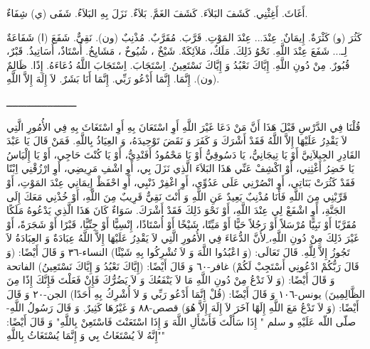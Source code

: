 \documentclass[a5paper]{article}
\begin{document}
أَغَاثَ. أَغِثْنِي. كَشَفَ البَلاَءَ. كَشَفَ الغَمَّ. بَلاَءٌ. نَزَلَ بِهِ البَلاَءُ. شَفَى (ي) شِفَاءٌ.

كَثُرَ (و) كَثْرَةٌ. إِيمَانٌ. عِنْدَ... عِنْدَ المَوْتِ. قَرَّبَ. مُقَرَّبٌ. مُذْنِبٌ (ون). نَقِيٌّ. شَفَعَ (ا) شَفَاعَةٌ لِـ... شَفَعَ عِنْدَ اللَّهِ. نَحْوُ ذَلِكَ. مَلَكٌ، مَلاَئِكَةٌ. شَيْخٌ ، شُيُوخٌ ، مَشَايِخُ. أُسْتَاذٌ، أَسَاتِيذُ. قَبْرٌ، قُبُورٌ. مِنْ دُونِ اللَّهِ. إِيَّاكَ نَعْبُدُ وَ إِيَّاكَ نَسْتَعِينُ. اِسْتَجَابَ. اِسْتَجَابَ اللَّهُ دُعَاءَهُ. إِذًا. ظَالِمٌ (ون). إِنَّمَا. إِنَّمَا أَدْعُو رَبِّي. إِنَّمَا أَنَا بَشَرٌ. لاَ إِلَهَ إِلاَّ اللَّهِ. 

ــــــــــــــــــــــــ

قُلْنَا فِي الدَّرْسِ قَبْلَ هَذَا أَنَّ مَنْ دَعَا غَيْرَ اللَّهِ أَوِ اسْتَعَانَ بِهِ أَوِ اسْتَغَاثَ بِهِ فِي الأُمُورِ الَّتِي لاَ يَقْدِرُ عَلَيْهَا إِلاَّ اللَّهُ فَقَدْ أَشْرَكَ وَ كَفَرَ وَ نَقَضَ تَوْحِيدَهُ، وَ العِيَاذُ بِاللَّهِ. فَمَنْ قَالَ يَا عَبْدَ القَادِرِ الجِيلاَنِيَّ أَوْ يَا تِيجَانِيُّ، يَا دَسُوقِيُّ أَوْ يَا مَحْمُودُ أَفَنْدِيُّ، أَوْ يَا كُنْتَ حَاجِي، أَوْ يَا إِلْيَاسُ يَا خَضِرُ أَغْثِنِي، أَوْ اكْشِفْ عَنِّي هَذَا البَلاَءَ الَّذِي نَزَلَ بِي، أَوِ اشْفِ مَرِيضِي، أَوِ ارْزُقْنِي اِبْنًا فَقَدْ كَثُرَتْ بَنَاتِي، أَوِ انْصُرْنِي عَلَى عَدُوِّي، أَوِ اغْفِرْ ذَنْبِي، أَوِ احْفَظْ إِيمَانِي عِنْدَ المَوْتِ، أَوْ قَرِّبْنِي مِنَ اللَّهِ فَأَنَا مُذْنِبٌ بَعِيدٌ عَنِ اللَّهِ وَ أَنْتَ نَقِيٌّ قَرِيبٌ مِنَ اللَّهِ، أَوْ خُذْنِي مَعَكَ إِلَى الجَنَّةِ، أَوِ اشْفَعْ لِي عِنْدَ اللَّهِ، أَوْ نَحْوَ ذَلِكَ فَقَدْ أَشْرَكَ. سَوَاءٌ كَانَ هَذَا الَّذِي يَدْعُوهُ مَلَكًا مُقَرَّبًا أَوْ نَبِيًّا مُرْسَلاً أَوْ رَجُلاً حَيًّا أَوْ مَيِّتًا، شَيْخًا أَوْ أُسْتَاذًا، إِنْسِيًّا أَوْ جِنِّيًّا، قَبْرًا أَوْ شَجَرَةً، أَوْ غَيْرَ ذَلِكَ مِنْ دُونِ اللَّهِ، ِلأَنَّ الدُّعَاءَ فِي الأُمُورِ الَّتِي لاَ يَقْدِرُ عَلَيْهَا إِلاَّ اللَّهُ عِبَادَةٌ وَ العِبَادَةُ لاَ تَجُوزُ إِلاَّ لِلَّهِ. قَالَ تَعَالَى: (وَ اعْبُدُوا اللَّهَ وَ لاَ تُشْرِكُوا بِهِ شَيْئًا) النساء-٣٦ وَ قَالَ أَيْضًا: (وَ قَالَ رَبُّكُمْ ادْعُونِي أَسْتَجِبْ لَكُمْ) غافر-٦٠ وَ قَالَ أَيْضًا: (إِيَّاكَ نَعْبُدُ وَ إِيَّاكَ نَسْتَعِينُ) الفاتحة وَ قَالَ أَيْضًا: (وَ لاَ تَدْعُ مِنْ دُونِ اللَّهِ مَا لاَ يَنْفَعُكَ وَ لاَ يَضُرُّكَ فَإِنْ فَعَلْتَ فَإِنَّكَ إِذًا مِنَ الظَّالِمِينَ) يونس-١٠٦ وَ قَالَ أَيْضًا: (قُلْ إِنَّمَا أَدْعُو رَبِّي وَ لاَ أُشْرِكُ بِهِ أَحَدًا) الجن-٢٠ وَ قَالَ أَيْضًا: (وَ لاَ تَدْعُ مَعَ اللَّهِ إِلَهًا آخَرَ لاَ إِلَهَ إِلاَّ هُوَ) قصص-٨٨ وَ غَيْرُهَا كَثِيرٌ. وَ قَالَ رَسُولُ اللَّهِ- صلّى اللّه عَلَيْهِ و سلم " إِذَا سَأَلْتَ فَأَسْأَلِ اللَّهَ وَ إِذَا اسْتَعَنْتَ فَاسْتَعِنْ بِاللَّهِ" وَ قَالَ أَيْضًا: "إِنَّهُ لاَ يُسْتَغَاثُ بِي وَ إِنَّمَا يُسْتَغَاثُ بِاللَّهِ"
\end{document}
